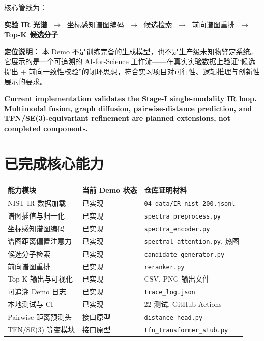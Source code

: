 \documentclass[11pt,a4paper]{ctexart}
\begin{document}
核心管线为：
\begin{center}
\begin{tcolorbox}[colback=bgblue, colframe=midblue, arc=2mm, boxrule=0.4pt,
  width=0.92\textwidth, halign=center]
\small
\textbf{实验 IR 光谱}
$\;\rightarrow\;$ 坐标感知谱图编码
$\;\rightarrow\;$ 候选检索
$\;\rightarrow\;$ 前向谱图重排
$\;\rightarrow\;$ \textbf{Top-K 候选分子}
\end{tcolorbox}
\end{center}

\textbf{定位说明：} 本 Demo 不是训练完备的生成模型，也不是生产级未知物鉴定系统。它展示的是一个可追溯的 AI-for-Science 工作流——在真实实验数据上验证``候选提出 + 前向一致性校验''的闭环思想，符合实习项目对可行性、逻辑推理与创新性展示的要求。

{\small\color{midblue}\textbf{Current implementation validates the Stage-I single-modality IR loop. Multimodal fusion, graph diffusion, pairwise-distance prediction, and TFN/SE(3)-equivariant refinement are planned extensions, not completed components.}}

\section{已完成核心能力}

\begin{table}[ht]
\small
\begin{tabular}{@{}p{} p{} p{}@{}}
\toprule
\bfseries 能力模块 & \bfseries 当前 Demo 状态 & \bfseries 仓库证明材料 \\
\midrule
NIST IR 数据加载 & 已实现 & \texttt{04\_data/IR\_nist\_200.jsonl} \\
谱图插值与归一化 & 已实现 & \texttt{spectra\_preprocess.py} \\
坐标感知谱图编码 & 已实现 & \texttt{spectra\_encoder.py} \\
谱图距离偏置注意力 & 已实现 & \texttt{spectral\_attention.py}, 热图 \\
候选分子检索 & 已实现 & \texttt{candidate\_generator.py} \\
前向谱图重排 & 已实现 & \texttt{reranker.py} \\
Top-K 输出与可视化 & 已实现 & CSV, PNG 输出文件 \\
可追溯 Demo 日志 & 已实现 & \texttt{trace\_log.json} \\
本地测试与 CI & 已实现 & 22 测试, GitHub Actions \\
\rowcolor{blue!3!white}
Pairwise 距离预测头 & 接口原型 & \texttt{distance\_head.py} \\
\rowcolor{blue!3!white}
TFN/SE(3) 等变模块 & 接口原型 & \texttt{tfn\_transformer\_stub.py} \\
\bottomrule
\end{tabular}
\end{table}
\end{document}
